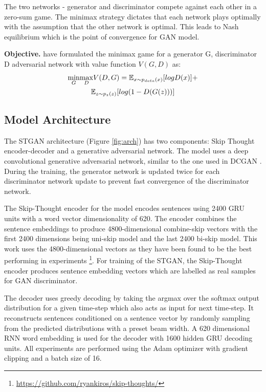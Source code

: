 \documentclass[11pt,a4paper]{article}
\DeclareMathOperator{\gmin}{min}
\begin{document}
The two networks - generator and discriminator compete against 
each other in a zero-sum game. The minimax strategy dictates that each
network plays optimally with the assumption that the other network is optimal. This 
leads to Nash equilibrium which is the point of convergence for GAN model.

\textbf{Objective.}
 have formulated the minimax game for a generator G,
discriminator D adversarial network with value function \(V(G,D)\) as:
\begin{multline*}
\underset{G}{\gmin} \underset{D}{\gmax} V(D, G) = {\mathbb{E}}_{x\sim p_{data}(x)}[log D(x)]+\\{\mathbb{E}}_{z\sim p_z(z)}[log(1 - D(G(z)))]
\end{multline*}

\subsection{Model Architecture}

The STGAN architecture (Figure \ref{fig:arch}) has two components: Skip Thought encoder-decoder and a generative adversarial network. The model uses a deep convolutional generative adversarial network, similar to the
one used in DCGAN \cite{dcgan}. During the training, the generator network is updated twice for each discriminator network update to prevent fast convergence of the discriminator network.

The Skip-Thought encoder for the model encodes sentences using 2400 GRU units \cite{gru} with a word vector dimensionality of 620. The encoder combines the sentence embeddings to produce 4800-dimensional combine-skip vectors with the first 2400 dimensions being uni-skip model and the last 2400 bi-skip model. This work uses the 4800-dimensional vectors as they have been found to be the best performing in experiments \footnote{\url{https://github.com/ryankiros/skip-thoughts/}}. For training of the STGAN, the Skip-Thought encoder produces sentence embedding vectors which are labelled as real samples for GAN discriminator.

The decoder uses greedy decoding by taking the argmax over the softmax output distribution for a given time-step which also acts as input for next time-step. It reconstructs sentences conditioned on a sentence vector by randomly sampling from the predicted distributions with a preset beam width. A 620 dimensional RNN word embedding is used for the decoder with 1600 hidden GRU decoding units. All experiments are performed using the Adam optimizer \cite{adam} with gradient clipping and a batch size of 16.
\end{document}
